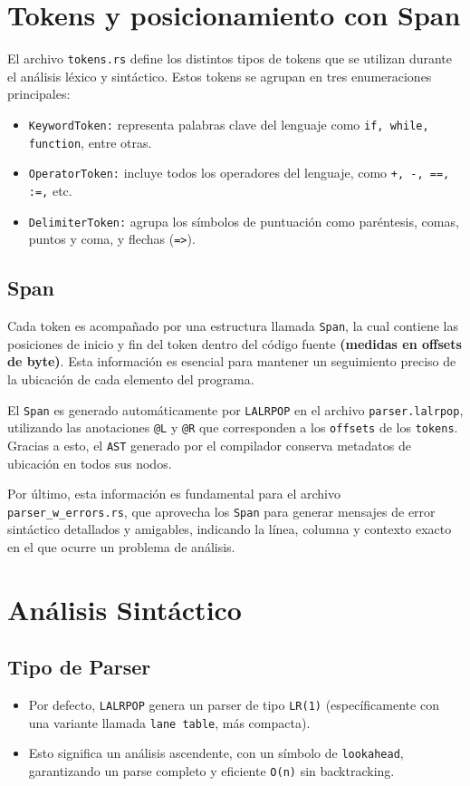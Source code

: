 \documentclass{article}
\begin{document}
\section{Tokens y posicionamiento con Span}
El archivo \texttt{tokens.rs} define los distintos tipos de tokens que se utilizan durante el análisis léxico y sintáctico. Estos tokens se agrupan en tres enumeraciones principales:
\begin{itemize}
    \item \texttt{KeywordToken:} representa palabras clave del lenguaje como \texttt{if, while, function}, entre otras.
    \item \texttt{OperatorToken:} incluye todos los operadores del lenguaje, como \texttt{+, -, ==, :=,} etc.
    \item \texttt{DelimiterToken:} agrupa los símbolos de puntuación como paréntesis, comas, puntos y coma, y flechas (\texttt{=>}).
\end{itemize}

\subsection{Span}
Cada token es acompañado por una estructura llamada \texttt{Span}, la cual contiene las posiciones de inicio y fin del token dentro del código fuente \textbf{(medidas en offsets de byte)}. Esta información es esencial para mantener un seguimiento preciso de la ubicación de cada elemento del programa.
\vspace{0.25cm}

El \texttt{Span} es generado automáticamente por \texttt{LALRPOP} en el archivo \texttt{parser.lalrpop}, utilizando las anotaciones \texttt{@L} y \texttt{@R} que corresponden a los \texttt{offsets} de los \texttt{tokens}. Gracias a esto, el \texttt{AST} generado por el compilador conserva metadatos de ubicación en todos sus nodos.
\vspace{0.25cm}

Por último, esta información es fundamental para el archivo \texttt{parser\_w\_errors.rs}, que aprovecha los \texttt{Span} para generar mensajes de error sintáctico detallados y amigables, indicando la línea, columna y contexto exacto en el que ocurre un problema de análisis.

\section{Análisis Sintáctico}
\subsection{Tipo de Parser}
\begin{itemize}
    \item Por defecto, \texttt{LALRPOP} genera un parser de tipo \texttt{LR(1)} (específicamente con una variante llamada \texttt{lane table}, más compacta).
    \item Esto significa un análisis ascendente, con un símbolo de \texttt{lookahead}, garantizando un parse completo y eficiente \texttt{O(n)} sin backtracking.
\end{itemize}
\end{document}
